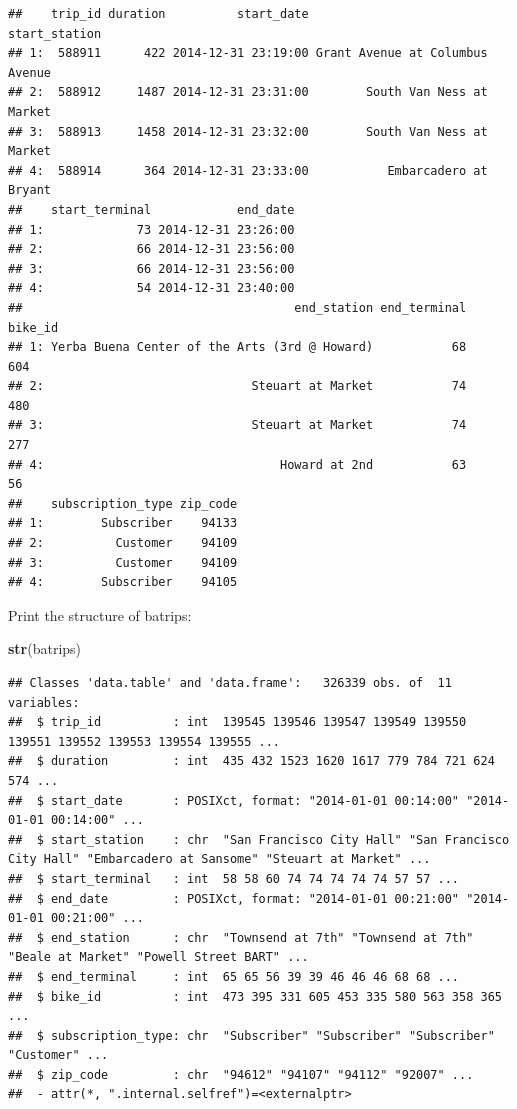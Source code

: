 \documentclass[]{book}
\newenvironment{Shaded}{\begin{snugshade}}{\end{snugshade}}
\newcommand{\KeywordTok}[1]{\textcolor[rgb]{0.13,0.29,0.53}{\textbf{#1}}}
\newcommand{\NormalTok}[1]{#1}
\begin{document}
\begin{verbatim}
##    trip_id duration          start_date                   start_station
## 1:  588911      422 2014-12-31 23:19:00 Grant Avenue at Columbus Avenue
## 2:  588912     1487 2014-12-31 23:31:00        South Van Ness at Market
## 3:  588913     1458 2014-12-31 23:32:00        South Van Ness at Market
## 4:  588914      364 2014-12-31 23:33:00           Embarcadero at Bryant
##    start_terminal            end_date
## 1:             73 2014-12-31 23:26:00
## 2:             66 2014-12-31 23:56:00
## 3:             66 2014-12-31 23:56:00
## 4:             54 2014-12-31 23:40:00
##                                      end_station end_terminal bike_id
## 1: Yerba Buena Center of the Arts (3rd @ Howard)           68     604
## 2:                             Steuart at Market           74     480
## 3:                             Steuart at Market           74     277
## 4:                                 Howard at 2nd           63      56
##    subscription_type zip_code
## 1:        Subscriber    94133
## 2:          Customer    94109
## 3:          Customer    94109
## 4:        Subscriber    94105
\end{verbatim}

Print the structure of batrips:

\begin{Shaded}
\begin{Highlighting}[]
\KeywordTok{str}\NormalTok{(batrips)}
\end{Highlighting}
\end{Shaded}

\begin{verbatim}
## Classes 'data.table' and 'data.frame':	326339 obs. of  11 variables:
##  $ trip_id          : int  139545 139546 139547 139549 139550 139551 139552 139553 139554 139555 ...
##  $ duration         : int  435 432 1523 1620 1617 779 784 721 624 574 ...
##  $ start_date       : POSIXct, format: "2014-01-01 00:14:00" "2014-01-01 00:14:00" ...
##  $ start_station    : chr  "San Francisco City Hall" "San Francisco City Hall" "Embarcadero at Sansome" "Steuart at Market" ...
##  $ start_terminal   : int  58 58 60 74 74 74 74 74 57 57 ...
##  $ end_date         : POSIXct, format: "2014-01-01 00:21:00" "2014-01-01 00:21:00" ...
##  $ end_station      : chr  "Townsend at 7th" "Townsend at 7th" "Beale at Market" "Powell Street BART" ...
##  $ end_terminal     : int  65 65 56 39 39 46 46 46 68 68 ...
##  $ bike_id          : int  473 395 331 605 453 335 580 563 358 365 ...
##  $ subscription_type: chr  "Subscriber" "Subscriber" "Subscriber" "Customer" ...
##  $ zip_code         : chr  "94612" "94107" "94112" "92007" ...
##  - attr(*, ".internal.selfref")=<externalptr>
\end{verbatim}
\end{document}
